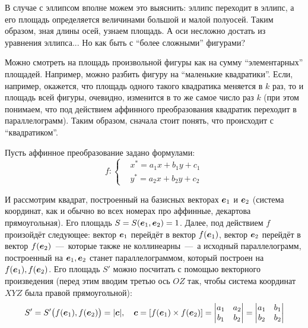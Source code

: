 \documentclass[a4paper,12pt]{article}
\begin{document}
  В случае с эллипсом вполне можем это выяснить: эллипс переходит в эллипс, а его площадь определяется величинами большой и малой полуосей.
  Таким образом, зная длины осей, узнаем площадь.
  А оси несложно достать из уравнения эллипса...
  Но как быть с ``более сложными'' фигурами?
  
  Можно смотреть на площадь произвольной фигуры как на сумму ``элементарных'' площадей.
  Например, можно разбить фигуру на ``маленькие квадратики''.
  Если, например, окажется, что площадь одного такого квадратика меняется в $k$ раз, то и площадь всей фигуры, очевидно, изменится в то же самое число раз $k$ (при этом понимаем, что под действием аффинного преобразования квадратик переходит в параллелограмм).
  Таким образом, сначала стоит понять, что происходит с ``квадратиком''.
  
  Пусть аффинное преобразование задано формулами:
  \begin{equation}\label{eq:affine-for-square-and-length}
    f\colon \left\{
      \begin{aligned}
        &x^* = a_1 x + b_1 y + c_1\\
        &y^* = a_2 x + b_2 y + c_2
      \end{aligned}
    \right.
  \end{equation}
  
  И рассмотрим квадрат, построенный на базисных векторах $\boldsymbol e_1$ и $\boldsymbol e_2$ (система координат, как и обычно во всех номерах про аффинные, декартова прямоугольная).
  Его площадь $S \hm= S(\bds e_1, \bds e_2) \hm= 1$.
  Далее, под действием $f$ произойдёт следующее: вектор $\boldsymbol e_1$ перейдёт в вектор $f(\boldsymbol e_1)$, вектор $\boldsymbol e_2$ перейдёт в вектор $f(\boldsymbol e_2)$~---~которые также не коллинеарны~---~а исходный параллелограмм, построенный на $\boldsymbol e_1, \boldsymbol e_2$ станет параллелограммом, который построен на $f(\boldsymbol e_1), f(\boldsymbol e_2)$.
  Его площадь $S'$ можно посчитать с помощью векторного произведения (перед этим вводим третью ось $OZ$ так, чтобы система координат $XYZ$ была правой прямоугольной):
  \[
    S' = S'\bigl(f(\boldsymbol e_1), f(\boldsymbol e_2)\bigr) = |\boldsymbol c|,\quad \boldsymbol c = [f(\boldsymbol e_1) \times f(\boldsymbol e_2)] = \begin{vmatrix}
      a_1 & a_2\\
      b_1 & b_2
    \end{vmatrix} = \begin{vmatrix}
      a_1 & b_1\\
      b_2 & b_2
    \end{vmatrix}
  \]
  
\end{document}
